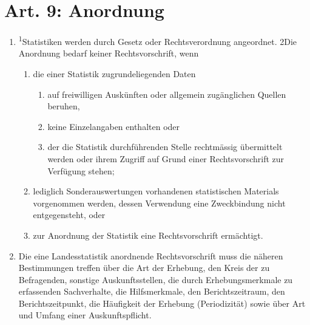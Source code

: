 \documentclass[A4, 12pt]{scrbook}
\begin{document}
    \section{Art. 9: Anordnung}
        \begin{enumerate}[label=(\arabic*)]
            \item \textsuperscript{1}Statistiken werden durch Gesetz oder Rechtsverordnung angeordnet. 2Die Anordnung bedarf keiner Rechtsvorschrift, wenn
            \begin{enumerate}[label=\arabic*.]
                \item die einer Statistik zugrundeliegenden Daten
                    \begin{enumerate}[label=(\alph*)]
                        \item auf freiwilligen Auskünften oder allgemein zugänglichen Quellen beruhen,
                        \item keine Einzelangaben enthalten oder
                        \item der die Statistik durchführenden Stelle rechtmässig übermittelt werden oder ihrem Zugriff auf Grund einer Rechtsvorschrift zur Verfügung stehen;
                    \end{enumerate}
                \item lediglich Sonderauswertungen vorhandenen statistischen Materials vorgenommen werden, dessen Verwendung eine Zweckbindung nicht entgegensteht, oder
                \item zur Anordnung der Statistik eine Rechtsvorschrift ermächtigt.
            \end{enumerate}
            \item Die eine Landesstatistik anordnende Rechtsvorschrift muss die näheren Bestimmungen treffen über die Art der Erhebung, den Kreis der zu Befragenden, sonstige Auskunftsstellen, die durch Erhebungsmerkmale zu erfassenden Sachverhalte, die Hilfsmerkmale, den Berichtszeitraum, den Berichtszeitpunkt, die Häufigkeit der Erhebung (Periodizität) sowie über Art und Umfang einer Auskunftspflicht.
        \end{enumerate}
\end{document}
